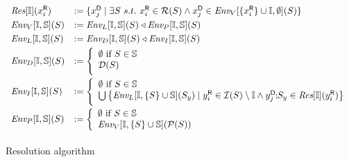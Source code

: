 \begin{figure}[t]
\renewcommand{\S}{\mathcal{S}}
\begin{boxedminipage}{\hsize}
\vspace*{-0.5\baselineskip}
$$
\begin{array}{ll}
  \Res{\seeni}{\ri{x}{i}} & := \{ \di{x}{j} \mid \exists S\ s.t.\ \ri{x}{i} \in \R{S} \wedge \di{x}{j} \in \Env{V}{\{\ri{x}{i}\} \cup \seeni}{\emptyset}{S} \} \smallskip  \\
  \Env{V}{\seeni}{\seens}{S}  & := \Env{L}{\seeni}{\seens}{S} \triangleleft \Env{P}{\seeni}{\seens}{S} \smallskip\\
 \Env{L}{\seeni}{\seens}{S} & := \Env{D}{\seeni}{\seens}{S} \triangleleft \Env{I}{\seeni}{\seens}{S} \smallskip\\
 \Env{D}{\seeni}{\seens}{S} &:= \left\{
    \begin{array}{l}
      \emptyset  \text{ if } S\in\seens\\
      \D{S}\smallskip\\
    \end{array}
 \right.\smallskip\\
 \Env{I}{\seeni}{\seens}{S} &:= \left\{
    \begin{array}{l}
      \emptyset  \text{ if } S\in\seens\\
      \bigcup \left\{ \Env{L}{\seeni}{\{S\}\cup\seens}{S_y} \mid \ri{y}{i} \in \I{S} \setminus 
\seeni \wedge \dsi{y}{j}{S_y} \in \Res{\seeni}{\ri{y}{i}}\right\}\smallskip\\
    \end{array}
 \right.\smallskip\\
 \Env{P}{\seeni}{\seens}{S} & := \left\{
    \begin{array}{l}
      \emptyset  \text{ if } S\in\seens\\
      \Env{V}{\seeni}{\{S\}\cup\seens}{\P{S}}
    \end{array}
 \right.\smallskip\\
\end{array}\medskip
$$
\vspace*{-1.5\baselineskip}
\end{boxedminipage}
\vspace*{-\baselineskip}
\caption{Resolution algorithm}
\label{fig:resalg}
\end{figure}
